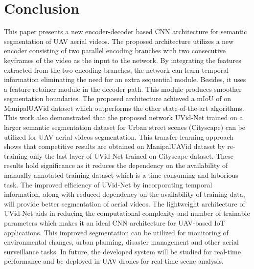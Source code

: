 \documentclass[journal]{IEEEtran}
\begin{document}
\section{Conclusion}
\par This paper presents a new encoder-decoder based CNN architecture for semantic segmentation of UAV aerial videos. The proposed architecture utilizes a new encoder consisting of two parallel encoding branches with two consecutive keyframes of the video as the input to the network. By integrating the features extracted from the two encoding branches, the network can learn temporal information eliminating the need for an extra sequential module. Besides, it uses a feature retainer module in the decoder path. This module produces smoother segmentation boundaries. The proposed architecture achieved a mIoU of  on ManipalUAVid dataset which outperforms the other state-of-the-art algorithms. 
This work also demonstrated that the proposed network UVid-Net trained on a larger semantic segmentation dataset for Urban street scenes (Cityscape) can be utilized for UAV aerial videos segmentation. This transfer learning approach shows that competitive results are obtained on ManipalUAVid dataset by re-training only the last layer of UVid-Net trained on Cityscape dataset.  These results hold significance as it reduces the dependency on the availability of manually annotated training dataset which is a time consuming and laborious task. 
The improved efficiency of UVid-Net by incorporating temporal information, along with reduced dependency on the availability of training data, will provide better segmentation of aerial videos. The lightweight architecture of UVid-Net aids in reducing the computational complexity and number of trainable parameters which makes it an ideal CNN architecture for UAV-based IoT applications. This improved segmentation can be utilized for monitoring of environmental changes, urban planning, disaster management and other aerial surveillance tasks.  In future, the developed system will be studied for real-time performance and be deployed in UAV drones for real-time scene analysis. 






































{\small
	
	
}
\end{document}
